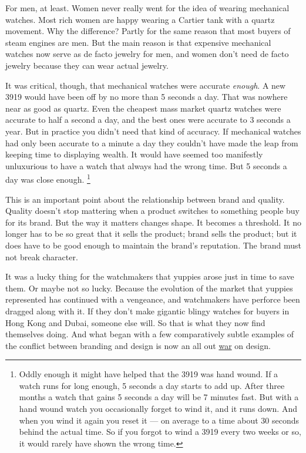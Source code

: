 \documentclass[12pt]{book}
\begin{document}
For men, at least. Women never really went for the idea of wearing
mechanical watches. Most rich women are happy wearing a Cartier tank
with a quartz movement. Why the difference? Partly for the same reason
that most buyers of steam engines are men. But the main reason is that
expensive mechanical watches now serve as de facto jewelry for men, and
women don't need de facto jewelry because they can wear actual jewelry.

It was critical, though, that mechanical watches were accurate
\emph{enough}. A new 3919 would have been off by no more than 5 seconds
a day. That was nowhere near as good as quartz. Even the cheapest mass
market quartz watches were accurate to half a second a day, and the best
ones were accurate to 3 seconds a year. But in practice you didn't need
that kind of accuracy. If mechanical watches had only been accurate to a
minute a day they couldn't have made the leap from keeping time to
displaying wealth. It would have seemed too manifestly unluxurious to
have a watch that always had the wrong time. But 5 seconds a day was
close enough. \footnote{Oddly enough it might have helped that the 3919 was hand wound.
If a watch runs for long enough, 5 seconds a day starts to add up. After
three months a watch that gains 5 seconds a day will be 7 minutes fast.
But with a hand wound watch you occasionally forget to wind it, and it
runs down. And when you wind it again you reset it --- on average to a
time about 30 seconds behind the actual time. So if you forgot to wind a
3919 every two weeks or so, it would rarely have shown the wrong time.}

This is an important point about the relationship between brand and
quality. Quality doesn't stop mattering when a product switches to
something people buy for its brand. But the way it matters changes
shape. It becomes a threshold. It no longer has to be so great that it
sells the product; brand sells the product; but it does have to be good
enough to maintain the brand's reputation. The brand must not break
character.

It was a lucky thing for the watchmakers that yuppies arose just in time
to save them. Or maybe not so lucky. Because the evolution of the market
that yuppies represented has continued with a vengeance, and watchmakers
have perforce been dragged along with it. If they don't make gigantic
blingy watches for buyers in Hong Kong and Dubai, someone else will. So
that is what they now find themselves doing. And what began with a few
comparatively subtle examples of the conflict between branding and
design is now an all out
\href{https://www.patek.com/en/collection/grand-complications/6300-400g-001}{war}
on design.
\end{document}
